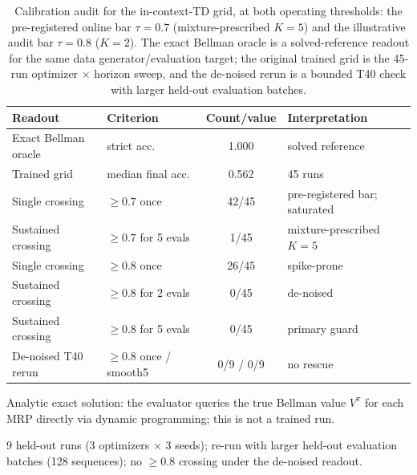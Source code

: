 \documentclass[11pt]{article}
\theoremstyle{plain}
\theoremstyle{definition}
\begin{document}
\begin{table}[htbp]
\centering
\caption{Calibration audit for the in-context-TD grid, at both operating thresholds:
the pre-registered online bar $\tau=0.7$ (mixture-prescribed $K=5$) and the illustrative
audit bar $\tau=0.8$ ($K=2$). The exact Bellman oracle is a
solved-reference readout for the same data generator/evaluation target; the original trained
grid is the 45-run optimizer $\times$ horizon sweep, and the de-noised rerun is a bounded T40
check with larger held-out evaluation batches.}
\label{tab:tdcalib}
\begin{threeparttable}
\begin{tabular}{llcl}
\toprule
Readout & Criterion & Count/value & Interpretation \\
\midrule
Exact Bellman oracle\tnote{a} & strict acc. & 1.000 & solved reference \\
Trained grid & median final acc. & 0.562 & 45 runs \\
Single crossing & $\geq0.7$ once & 42/45 & pre-registered bar; saturated \\
Sustained crossing & $\geq0.7$ for 5 evals & 1/45 & mixture-prescribed $K{=}5$ \\
Single crossing & $\geq0.8$ once & 26/45 & spike-prone \\
Sustained crossing & $\geq0.8$ for 2 evals & 0/45 & de-noised \\
Sustained crossing & $\geq0.8$ for 5 evals & 0/45 & primary guard \\
De-noised T40 rerun\tnote{b} & $\geq0.8$ once / smooth5 & 0/9 / 0/9 & no rescue \\
\bottomrule
\end{tabular}
\begin{tablenotes}[flushleft]
\footnotesize
\item[a] Analytic exact solution: the evaluator queries the true Bellman value $V^\pi$ for each MRP directly via dynamic programming; this is not a trained run.
\item[b] 9 held-out runs (3 optimizers $\times$ 3 seeds); re-run with larger held-out evaluation batches (128 sequences); no $\geq0.8$ crossing under the de-noised readout.
\end{tablenotes}
\end{threeparttable}
\end{table}
\end{document}

